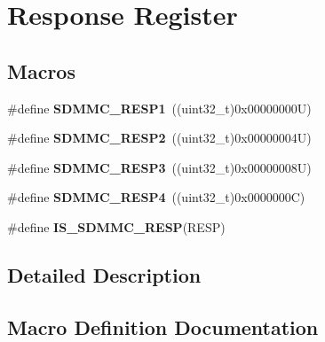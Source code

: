 \hypertarget{group___s_d_m_m_c___l_l___response___registers}{}\section{Response Register}
\label{group___s_d_m_m_c___l_l___response___registers}
\subsection*{Macros}
\begin{DoxyCompactItemize}
\item 
\mbox{\label{group___s_d_m_m_c___l_l___response___registers_gaac69967aaf92eb9ebfbd3798f99f1fd1}} 
\#define {\bfseries S\+D\+M\+M\+C\+\_\+\+R\+E\+S\+P1}~((uint32\+\_\+t)0x00000000\+U)
\item 
\mbox{\label{group___s_d_m_m_c___l_l___response___registers_gabea83892def6e645168aa685deba5169}} 
\#define {\bfseries S\+D\+M\+M\+C\+\_\+\+R\+E\+S\+P2}~((uint32\+\_\+t)0x00000004\+U)
\item 
\mbox{\label{group___s_d_m_m_c___l_l___response___registers_gafd13f3ed49e4db3ce982e099fb043e98}} 
\#define {\bfseries S\+D\+M\+M\+C\+\_\+\+R\+E\+S\+P3}~((uint32\+\_\+t)0x00000008\+U)
\item 
\mbox{\label{group___s_d_m_m_c___l_l___response___registers_ga67ceb48525a9873f589366a002c1ae38}} 
\#define {\bfseries S\+D\+M\+M\+C\+\_\+\+R\+E\+S\+P4}~((uint32\+\_\+t)0x0000000\+C)
\item 
\#define {\bfseries I\+S\+\_\+\+S\+D\+M\+M\+C\+\_\+\+R\+E\+SP}(R\+E\+SP)
\end{DoxyCompactItemize}


\subsection{Detailed Description}


\subsection{Macro Definition Documentation}
\mbox{\label{group___s_d_m_m_c___l_l___response___registers_gae37a1c8aa9255048b3c6addf69063c54}} 
